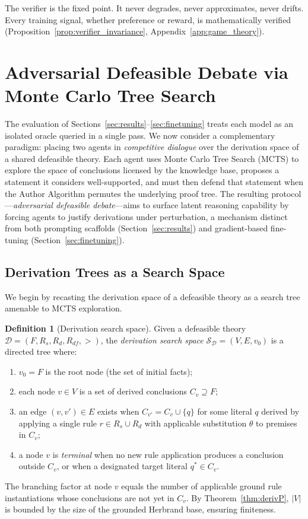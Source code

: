 \documentclass{article}
\theoremstyle{definition}
\newtheorem{definition}[theorem]{Definition}
\newcommand{\D}{\mathcal{D}}
\newcommand{\Rs}{R_s}
\newcommand{\Rd}{R_d}
\newcommand{\Rdf}{R_{df}}
\newcommand{\SD}{\mathcal{S}_{\D}}
\begin{document}
The verifier is the fixed point. It never degrades, never approximates, never drifts. Every training signal, whether preference or reward, is mathematically verified (Proposition~\ref{prop:verifier_invariance}, Appendix~\ref{app:game_theory}).


\section{Adversarial Defeasible Debate via Monte Carlo Tree Search}\label{sec:debate}

The evaluation of Sections~\ref{sec:results}--\ref{sec:finetuning} treats each model as an isolated oracle queried in a single pass. We now consider a complementary paradigm: placing two agents in \emph{competitive dialogue} over the derivation space of a shared defeasible theory. Each agent uses Monte Carlo Tree Search (MCTS) to explore the space of conclusions licensed by the knowledge base, proposes a statement it considers well-supported, and must then defend that statement when the Author Algorithm permutes the underlying proof tree. The resulting protocol---\emph{adversarial defeasible debate}---aims to surface latent reasoning capability by forcing agents to justify derivations under perturbation, a mechanism distinct from both prompting scaffolds (Section~\ref{sec:results}) and gradient-based fine-tuning (Section~\ref{sec:finetuning}).

\subsection{Derivation Trees as a Search Space}\label{subsec:deriv-search}

We begin by recasting the derivation space of a defeasible theory as a search tree amenable to MCTS exploration.

\begin{definition}[Derivation search space]
\label{def:deriv-search-space}
Given a defeasible theory $\D = (F, \Rs, \Rd, \Rdf, >)$, the \emph{derivation search space} $\SD = (V, E, v_0)$ is a directed tree where:
\begin{enumerate}[nosep]
  \item $v_0 = F$ is the root node (the set of initial facts);
  \item each node $v \in V$ is a set of derived conclusions $C_v \supseteq F$;
  \item an edge $(v, v') \in E$ exists when $C_{v'} = C_v \cup \{q\}$ for some literal $q$ derived by applying a single rule $r \in \Rs \cup \Rd$ with applicable substitution $\theta$ to premises in $C_v$;
  \item a node $v$ is \emph{terminal} when no new rule application produces a conclusion outside $C_v$, or when a designated target literal $q^* \in C_v$.
\end{enumerate}
The branching factor at node $v$ equals the number of applicable ground rule instantiations whose conclusions are not yet in $C_v$. By Theorem~\ref{thm:derivP}, $|V|$ is bounded by the size of the grounded Herbrand base, ensuring finiteness.
\end{definition}
\end{document}
